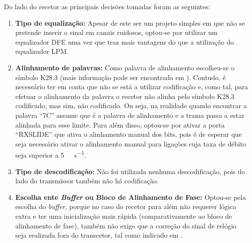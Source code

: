 \documentclass[11pt,a4paper]{article}
\begin{document}
	Do lado do recetor as principais decisões tomadas foram as seguintes:
	\begin{enumerate}
		\item \textbf{Tipo de equalização:} Apesar de este ser um projeto simples em que não se pretende inserir o sinal em canais ruidosos, optou-se por utilizar um equalizador DFE uma vez que traz mais vantagens do que a utilização do equalizador LPM.
		
		\item \textbf{Alinhamento de palavras:} Como palavra de alinhamento escolheu-se o símbolo K28.3 (mais informação pode ser encontrada em \cite{R041}). Contudo, é necessário ter em conta que não se está a utilizar codificação e, como tal, para efetuar o alinhamento da palavra o recetor não alinha pelo símbolo K28.3 codificado, mas sim, não codificado. Ou seja, na realidade quando encontrar a palavra ``7C'' assume que é a palavra de alinhamento e a trama passa a estar alinhada para esse limite. Para além disso, optou-se por ativar a porta ``RXSLIDE'' que ativa o alinhamento manual dos bits, pois é de esperar que seja necessário ativar o alinhamento manual para ligações cuja taxa de débito seja superior a \SI{5}{\giga\bit\per\second}.
		
		\item \textbf{Tipo de descodificação:} Não foi utilizada nenhuma descodificação, pois do lado do transmissor também não há codificação.
		\item \textbf{Escolha ente \textit{Buffer} ou Bloco de Alinhamento de Fase:} Optou-se pela escolha do \textit{buffer}, porque no caso do recetor para além não requerer lógica extra e ter uma inicialização mais rápida (comparativamente ao bloco de alinhamento de fase), também não exige que a correção do sinal de relógio seja realizada fora do transcetor, tal como indicado em \cite{R011}.
	\end{enumerate}
	
\end{document}

